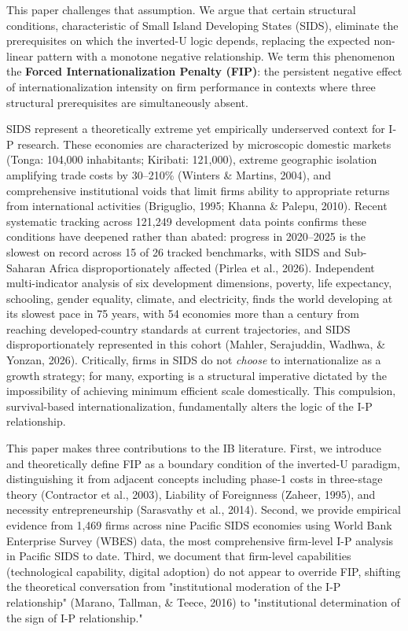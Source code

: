 \documentclass[12pt,a4paper]{article}
\begin{document}
This paper challenges that assumption. We argue that certain structural
conditions, characteristic of Small Island Developing States (SIDS),
eliminate the prerequisites on which the inverted-U logic depends,
replacing the expected non-linear pattern with a monotone negative
relationship. We term this phenomenon the \textbf{Forced
Internationalization Penalty (FIP)}: the persistent negative effect of
internationalization intensity on firm performance in contexts where
three structural prerequisites are simultaneously absent.

SIDS represent a theoretically extreme yet empirically underserved
context for I-P research. These economies are characterized by
microscopic domestic markets (Tonga: 104,000 inhabitants; Kiribati:
121,000), extreme geographic isolation amplifying trade costs by
30--210\% (Winters \& Martins, 2004), and comprehensive institutional
voids that limit firms\textquotesingle{} ability to appropriate returns
from international activities (Briguglio, 1995; Khanna \& Palepu, 2010).
Recent systematic tracking across 121,249 development data points
confirms these conditions have deepened rather than abated: progress in
2020--2025 is the slowest on record across 15 of 26 tracked benchmarks,
with SIDS and Sub-Saharan Africa disproportionately affected (Pirlea et
al., 2026). Independent multi-indicator analysis of six development
dimensions, poverty, life expectancy, schooling, gender equality,
climate, and electricity, finds the world developing at its slowest pace
in 75 years, with 54 economies more than a century from reaching
developed-country standards at current trajectories, and SIDS
disproportionately represented in this cohort (Mahler, Serajuddin,
Wadhwa, \& Yonzan, 2026). Critically, firms in SIDS do not \emph{choose}
to internationalize as a growth strategy; for many, exporting is a
structural imperative dictated by the impossibility of achieving minimum
efficient scale domestically. This compulsion, survival-based
internationalization, fundamentally alters the logic of the I-P
relationship.

This paper makes three contributions to the IB literature. First, we
introduce and theoretically define FIP as a boundary condition of the
inverted-U paradigm, distinguishing it from adjacent concepts including
phase-1 costs in three-stage theory (Contractor et al., 2003), Liability
of Foreignness (Zaheer, 1995), and necessity entrepreneurship
(Sarasvathy et al., 2014). Second, we provide empirical evidence from
1,469 firms across nine Pacific SIDS economies using World Bank
Enterprise Survey (WBES) data, the most comprehensive firm-level I-P
analysis in Pacific SIDS to date. Third, we document that firm-level
capabilities (technological capability, digital adoption) do not appear
to override FIP, shifting the theoretical conversation from
"institutional moderation of the I-P relationship" (Marano, Tallman, \&
Teece, 2016) to "institutional determination of the sign of I-P
relationship."
\end{document}
